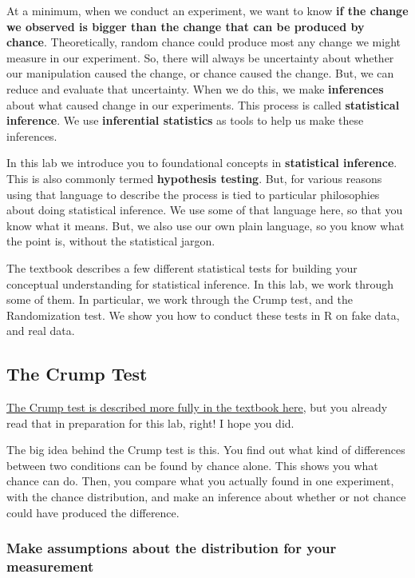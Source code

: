 \documentclass[
]{book}
\begin{document}
At a minimum, when we conduct an experiment, we want to know \textbf{if the change we observed is bigger than the change that can be produced by chance}. Theoretically, random chance could produce most any change we might measure in our experiment. So, there will always be uncertainty about whether our manipulation caused the change, or chance caused the change. But, we can reduce and evaluate that uncertainty. When we do this, we make \textbf{inferences} about what caused change in our experiments. This process is called \textbf{statistical inference}. We use \textbf{inferential statistics} as tools to help us make these inferences.

In this lab we introduce you to foundational concepts in \textbf{statistical inference}. This is also commonly termed \textbf{hypothesis testing}. But, for various reasons using that language to describe the process is tied to particular philosophies about doing statistical inference. We use some of that language here, so that you know what it means. But, we also use our own plain language, so you know what the point is, without the statistical jargon.

The textbook describes a few different statistical tests for building your conceptual understanding for statistical inference. In this lab, we work through some of them. In particular, we work through the Crump test, and the Randomization test. We show you how to conduct these tests in R on fake data, and real data.

\hypertarget{the-crump-test}{%
\subsection{The Crump Test}\label{the-crump-test}}

\href{https://crumplab.github.io/statistics/foundations-for-inference.html\#the-crump-test}{The Crump test is described more fully in the textbook here}, but you already read that in preparation for this lab, right! I hope you did.

The big idea behind the Crump test is this. You find out what kind of differences between two conditions can be found by chance alone. This shows you what chance can do. Then, you compare what you actually found in one experiment, with the chance distribution, and make an inference about whether or not chance could have produced the difference.

\hypertarget{make-assumptions-about-the-distribution-for-your-measurement}{%
\subsubsection{Make assumptions about the distribution for your measurement}\label{make-assumptions-about-the-distribution-for-your-measurement}}
\end{document}
